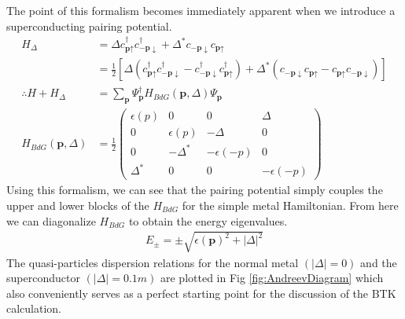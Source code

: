The point of this formalism becomes immediately apparent when we introduce a superconducting pairing potential.
\begin{align}
    H_{\Delta} &= \Delta c_{\textbf{p}\uparrow}^{\dagger}c_{-\textbf{p}\downarrow}^{\dagger}+\Delta^{*}c_{-\textbf{p}\downarrow}c_{\textbf{p}\uparrow}\\
    &= \frac{1}{2}\left[\Delta\left(c_{\textbf{p}\uparrow}^{\dagger}c_{-\textbf{p}\downarrow}^{\dagger}-c_{-\textbf{p}\downarrow}^{\dagger}c_{\textbf{p}\uparrow}^{\dagger}\right)+\Delta^{*}\left(c_{-\textbf{p}\downarrow}c_{\textbf{p}\uparrow}-c_{\textbf{p}\uparrow}c_{-\textbf{p}\downarrow}\right)\right]\\
    \therefore H+H_{\Delta} &= \sum_{\textbf{p}}\Psi_{\textbf{p}}^{\dagger}H_{BdG}(\textbf{p},\Delta)\Psi_{\textbf{p}}\\
    H_{BdG}(\textbf{p},\Delta) &= \frac{1}{2}
    \begin{pmatrix}
    \epsilon(p) & 0 & 0 & \Delta\\
    0 & \epsilon(p) & -\Delta & 0\\
    0 & -\Delta^{*} & -\epsilon(-p) & 0\\
    \Delta^{*} & 0 & 0 & -\epsilon(-p)
    \end{pmatrix}
\end{align}
Using this formalism, we can see that the pairing potential simply couples the upper and lower blocks of the $H_{BdG}$ for the simple metal Hamiltonian. From here we can diagonalize $H_{BdG}$ to obtain the energy eigenvalues.
\begin{align}
    E_{\pm} = \pm\sqrt{\epsilon(\textbf{p})^{2}+|\Delta|^{2}}
\end{align}
The quasi-particles dispersion relations for the normal metal $(|\Delta|=0)$ and the superconductor $(|\Delta|=0.1m)$ are plotted in Fig \ref{fig:AndreevDiagram} which also conveniently serves as a perfect starting point for the discussion of the \ac{BTK} calculation.\par


